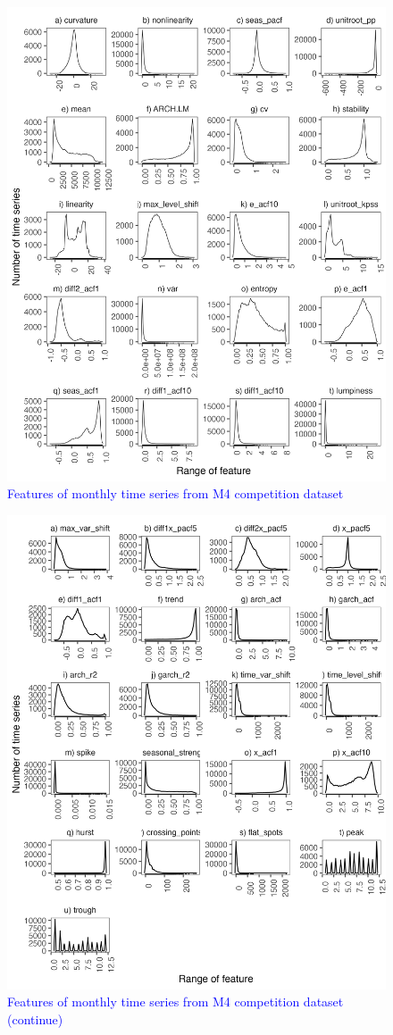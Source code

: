 \documentclass[preprint, 3p,
authoryear]{elsarticle} %
\begin{document}
\begin{figure}[H]

{\centering \includegraphics[width=0.7\linewidth]{img/300dpi/featurets_selection1} 

}

\caption{ \textcolor{blue}{Features of monthly time series from M4 competition dataset} }\label{fig:feature1}
\end{figure}

\begin{figure}[H]

{\centering \includegraphics[width=0.7\linewidth]{img/300dpi/featurets_selection2} 

}

\caption{ \textcolor{blue}{Features of monthly time series from M4 competition dataset (continue)} }\label{fig:feature2}
\end{figure}
\end{document}
